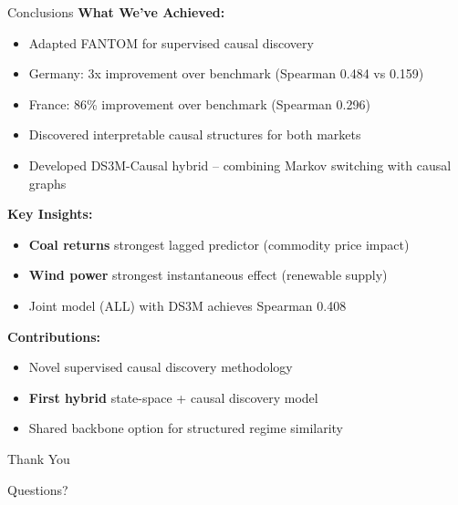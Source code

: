 \documentclass[aspectratio=169]{beamer}
\begin{document}
\begin{frame}{Conclusions}
\textbf{What We've Achieved:}
\begin{itemize}
    \item \textcolor{reprogreen}{Adapted FANTOM for supervised causal discovery}
    \item \textcolor{reprogreen}{Germany: 3x improvement over benchmark (Spearman 0.484 vs 0.159)}
    \item \textcolor{reprogreen}{France: 86\% improvement over benchmark (Spearman 0.296)}
    \item \textcolor{reprogreen}{Discovered interpretable causal structures for both markets}
    \item \textcolor{reprogreen}{Developed DS3M-Causal hybrid} -- combining Markov switching with causal graphs
\end{itemize}

\vspace{0.2cm}
\textbf{Key Insights:}
\begin{itemize}
    \item \textbf{Coal returns} strongest lagged predictor (commodity price impact)
    \item \textbf{Wind power} strongest instantaneous effect (renewable supply)
    \item Joint model (ALL) with DS3M achieves Spearman 0.408
\end{itemize}

\vspace{0.2cm}
\textbf{Contributions:}
\begin{itemize}
    \item Novel supervised causal discovery methodology
    \item \textbf{First hybrid} state-space + causal discovery model
    \item Shared backbone option for structured regime similarity
\end{itemize}
\end{frame}

\begin{frame}
\centering
\Huge Thank You

\vspace{1cm}
\Large Questions?


\end{frame}
\end{document}
